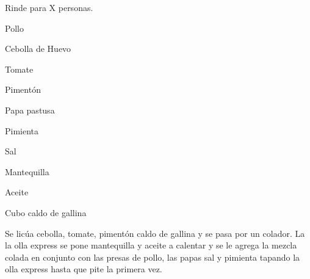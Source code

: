 
Rinde para X personas.

\begin{ingredientes}
\item Pollo
\item Cebolla de Huevo
\item Tomate
\item Pimentón
\item Papa pastusa
\item Pimienta
\item Sal
\item Mantequilla
\item Aceite
\item Cubo caldo de gallina
\end{ingredientes}
\preparacion
Se licúa cebolla, tomate, pimentón caldo de gallina y se pasa por un colador. La la olla express se pone mantequilla y aceite a calentar y se le agrega la mezcla colada en conjunto con las presas de pollo, las papas sal y pimienta tapando la olla express hasta que pite la primera vez.


